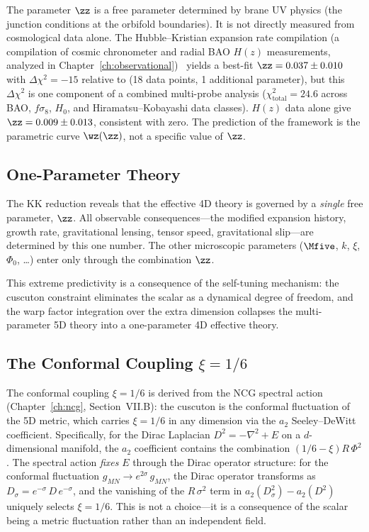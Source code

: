 The parameter $\zz$ is a free parameter determined by brane UV physics (the junction conditions at the orbifold boundaries). It is not directly measured from cosmological data alone. The Hubble--Kristian expansion rate compilation (a compilation of cosmic chronometer and radial BAO $H(z)$ measurements, analyzed in Chapter~\ref{ch:observational})~\cite{ch1:hk-compilation} yields a best-fit $\zz = 0.037 \pm 0.010$ with $\Delta\chi^2 = -15$ relative to \LCDM{} (18 data points, 1 additional parameter), but this $\Delta\chi^2$ is one component of a combined multi-probe analysis ($\chi^2_{\mathrm{total}} = 24.6$ across BAO, $f\sigma_8$, $H_0$, and Hiramatsu--Kobayashi data classes). $H(z)$ data alone give $\zz = 0.009 \pm 0.013$, consistent with zero. The prediction of the framework is the parametric curve $\wz(\zz)$, not a specific value of $\zz$.

\subsection{One-Parameter Theory}
\label{sec:1-one-param}

The KK reduction reveals that the effective 4D theory is governed by a \emph{single} free parameter, $\zz$. All observable consequences---the modified expansion history, growth rate, gravitational lensing, tensor speed, gravitational slip---are determined by this one number. The other microscopic parameters ($\Mfive$, $k$, $\xi$, $\Phi_0$, \ldots) enter only through the combination $\zz$.

This extreme predictivity is a consequence of the self-tuning mechanism: the cuscuton constraint eliminates the scalar as a dynamical degree of freedom, and the warp factor integration over the extra dimension collapses the multi-parameter 5D theory into a one-parameter 4D effective theory.

\subsection{The Conformal Coupling \texorpdfstring{$\xi = 1/6$}{xi = 1/6}}
\label{sec:1-conformal-coupling}

The conformal coupling $\xi = 1/6$ is derived from the NCG spectral action (Chapter~\ref{ch:ncg}, Section~VII.B): the cuscuton is the conformal fluctuation of the 5D metric, which carries $\xi = 1/6$ in any dimension via the $a_2$ Seeley--DeWitt coefficient.  Specifically, for the Dirac Laplacian $D^2 = -\nabla^2 + E$ on a $d$-dimensional manifold, the $a_2$ coefficient contains the combination $(1/6 - \xi)R\,\Phi^2$. The spectral action \emph{fixes} $E$ through the Dirac operator structure: for the conformal fluctuation $g_{MN} \to e^{2\sigma}\, g_{MN}$, the Dirac operator transforms as $D_\sigma = e^{-\sigma}\, D\, e^{-\sigma}$, and the vanishing of the $R\,\sigma^2$ term in $a_2(D_\sigma^2) - a_2(D^2)$ uniquely selects $\xi = 1/6$. This is not a choice---it is a consequence of the scalar being a metric fluctuation rather than an independent field.

